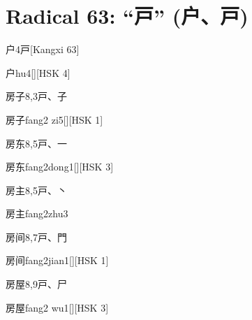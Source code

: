 
\section*{Radical 63: ``⼾'' (户、戸)}

\begin{entry}{户}{4}{⼾}[Kangxi 63]
  \begin{phonetics}{户}{hu4}[][HSK 4]
  \end{phonetics}
\end{entry}

\begin{entry}{房子}{8,3}{⼾、⼦}
  \begin{phonetics}{房子}{fang2 zi5}[][HSK 1]
  \end{phonetics}
\end{entry}

\begin{entry}{房东}{8,5}{⼾、⼀}
  \begin{phonetics}{房东}{fang2dong1}[][HSK 3]
  \end{phonetics}
\end{entry}

\begin{entry}{房主}{8,5}{⼾、⼂}
  \begin{phonetics}{房主}{fang2zhu3}
  \end{phonetics}
\end{entry}

\begin{entry}{房间}{8,7}{⼾、⾨}
  \begin{phonetics}{房间}{fang2jian1}[][HSK 1]
  \end{phonetics}
\end{entry}

\begin{entry}{房屋}{8,9}{⼾、⼫}
  \begin{phonetics}{房屋}{fang2 wu1}[][HSK 3]
  \end{phonetics}
\end{entry}

